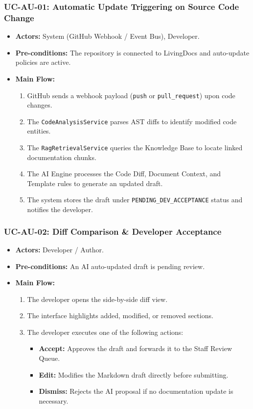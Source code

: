 \subsubsection{UC-AU-01: Automatic Update Triggering on Source Code Change}
\begin{itemize}
    \item \textbf{Actors:} System (GitHub Webhook / Event Bus), Developer.
    \item \textbf{Pre-conditions:} The repository is connected to LivingDocs and auto-update policies are active.
    \item \textbf{Main Flow:}
    \begin{enumerate}
        \item GitHub sends a webhook payload (\texttt{push} or \texttt{pull\_request}) upon code changes.
        \item The \texttt{CodeAnalysisService} parses AST diffs to identify modified code entities.
        \item The \texttt{RagRetrievalService} queries the Knowledge Base to locate linked documentation chunks.
        \item The AI Engine processes the Code Diff, Document Context, and Template rules to generate an updated draft.
        \item The system stores the draft under \texttt{PENDING\_DEV\_ACCEPTANCE} status and notifies the developer.
    \end{enumerate}
\end{itemize}

\subsubsection{UC-AU-02: Diff Comparison \& Developer Acceptance}
\begin{itemize}
    \item \textbf{Actors:} Developer / Author.
    \item \textbf{Pre-conditions:} An AI auto-updated draft is pending review.
    \item \textbf{Main Flow:}
    \begin{enumerate}
        \item The developer opens the side-by-side diff view.
        \item The interface highlights added, modified, or removed sections.
        \item The developer executes one of the following actions:
        \begin{itemize}
            \item \textbf{Accept:} Approves the draft and forwards it to the Staff Review Queue.
            \item \textbf{Edit:} Modifies the Markdown draft directly before submitting.
            \item \textbf{Dismiss:} Rejects the AI proposal if no documentation update is necessary.
        \end{itemize}
    \end{enumerate}
\end{itemize}

